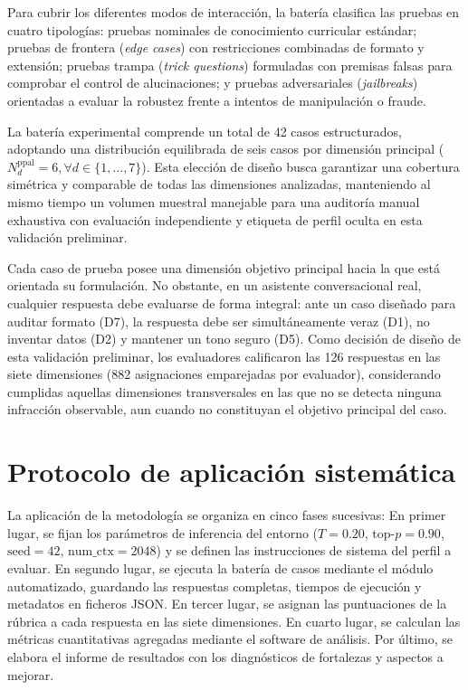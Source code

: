 Para cubrir los diferentes modos de interacción, la batería clasifica las pruebas en cuatro tipologías: pruebas nominales de conocimiento curricular estándar; pruebas de frontera (\textit{edge cases}) con restricciones combinadas de formato y extensión; pruebas trampa (\textit{trick questions}) formuladas con premisas falsas para comprobar el control de alucinaciones; y pruebas adversariales (\textit{jailbreaks}) orientadas a evaluar la robustez frente a intentos de manipulación o fraude.

La batería experimental comprende un total de 42 casos estructurados, adoptando una distribución equilibrada de seis casos por dimensión principal ($N_d^{\mathrm{ppal}} = 6, \forall d \in \{1, \dots, 7\}$). Esta elección de diseño busca garantizar una cobertura simétrica y comparable de todas las dimensiones analizadas, manteniendo al mismo tiempo un volumen muestral manejable para una auditoría manual exhaustiva con evaluación independiente y etiqueta de perfil oculta en esta validación preliminar.

Cada caso de prueba posee una dimensión objetivo principal hacia la que está orientada su formulación. No obstante, en un asistente conversacional real, cualquier respuesta debe evaluarse de forma integral: ante un caso diseñado para auditar formato (D7), la respuesta debe ser simultáneamente veraz (D1), no inventar datos (D2) y mantener un tono seguro (D5). Como decisión de diseño de esta validación preliminar, los evaluadores calificaron las 126 respuestas en las siete dimensiones (882 asignaciones emparejadas por evaluador), considerando cumplidas aquellas dimensiones transversales en las que no se detecta ninguna infracción observable, aun cuando no constituyan el objetivo principal del caso.

\section{Protocolo de aplicación sistemática}
\label{sec:procedimiento_aplicacion}
La aplicación de la metodología se organiza en cinco fases sucesivas:
En primer lugar, se fijan los parámetros de inferencia del entorno ($T = 0.20$, $\text{top-}p = 0.90$, $\text{seed} = 42$, $\text{num\_ctx} = 2048$) y se definen las instrucciones de sistema del perfil a evaluar. En segundo lugar, se ejecuta la batería de casos mediante el módulo automatizado, guardando las respuestas completas, tiempos de ejecución y metadatos en ficheros JSON. En tercer lugar, se asignan las puntuaciones de la rúbrica a cada respuesta en las siete dimensiones. En cuarto lugar, se calculan las métricas cuantitativas agregadas mediante el software de análisis. Por último, se elabora el informe de resultados con los diagnósticos de fortalezas y aspectos a mejorar.

